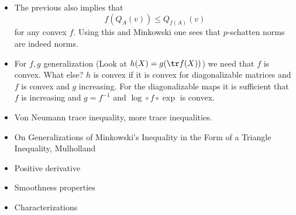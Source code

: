 \begin{itemize}
	\item The previous also implies that
	\[
		f(Q_{A}(v)) \leq Q_{f(A)}(v)
	\]
	for any convex $f$. Using this and Minkowski one sees that $p$-schatten norms are indeed norms.
	\item For $f, g$ generalization (Look at $h(X) = g (\tr f(X))$) we need that $f$ is convex. What else? $h$ is convex if it is convex for diagonalizable matrices and $f$ is convex and $g$ increasing. For the diagonalizable maps it is sufficient that $f$ is increasing and $g = f^{-1}$ and $\log \circ f \circ \exp$ is convex.
	\item Von Neumann trace inequality, more trace inequalities.
	\item On Generalizations of Minkowski's Inequality in the Form of a Triangle Inequality, Mulholland
	\item Positive derivative
	\item Smoothness properties
	\item Characterizations
\end{itemize}
